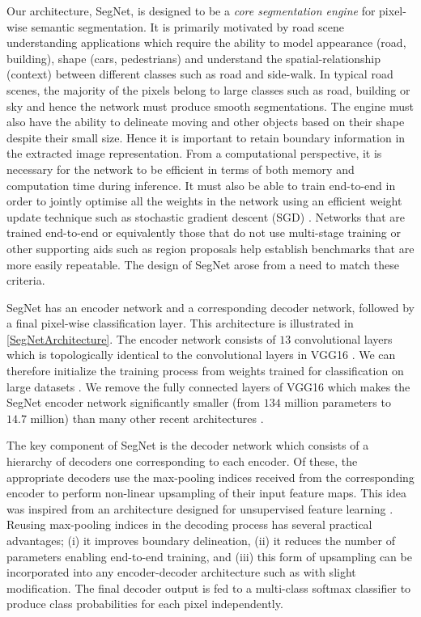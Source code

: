 Our architecture, SegNet, is designed to be a \textit{core segmentation engine} for pixel-wise semantic segmentation. It is primarily motivated by road scene understanding applications which require the ability to model appearance (road, building), shape (cars, pedestrians) and understand the spatial-relationship (context) between different classes such as road and side-walk. In typical road scenes, the majority of the pixels belong to large classes such as road, building or sky and hence the network must produce smooth segmentations. The engine must also have the ability to delineate moving and other objects based on their shape despite their small size. Hence it is important to retain boundary information in the extracted image representation. From a computational perspective, it is necessary for the network to be efficient in terms of both memory and computation time during inference. It must also be able to train end-to-end in order to jointly optimise all the weights in the network using an efficient weight update technique such as stochastic gradient descent (SGD) \citep{Bottou}. Networks that are trained end-to-end or equivalently those that do not use multi-stage training \citep{long2015fully} or other supporting aids such as region proposals \citep{NohDeconvNets} help establish benchmarks that are more easily repeatable. The design of SegNet arose from a need to match these criteria.

SegNet has an encoder network and a corresponding decoder network, followed by a final pixel-wise classification layer. This architecture is illustrated in \cref{SegNetArchitecture}. The encoder network consists of $13$ convolutional layers which is topologically identical to the convolutional layers in VGG16 \citep{simonyan2014very}. We can therefore initialize the training process from weights trained for classification on large datasets \citep{deng2009imagenet}. We remove the fully connected layers of VGG16 which makes the SegNet encoder network significantly smaller (from $134$ million parameters to $14.7$ million) than many other recent architectures \citep{long2015fully,NohDeconvNets,ParseNetRabinovich,DecoupledNet}. 

The key component of SegNet is the decoder network which consists of a hierarchy of decoders one corresponding to each encoder. Of these, the appropriate decoders use the max-pooling indices received from the corresponding encoder to perform non-linear upsampling of their input feature maps. This idea was inspired from an architecture designed for unsupervised feature learning \citep{Ranzato}. Reusing max-pooling indices in the decoding process has several practical advantages; (i) it improves boundary delineation, (ii) it reduces the number of  parameters enabling end-to-end training, and (iii) this form of upsampling can be incorporated into any encoder-decoder architecture such as \citep{long2015fully,CRFRNN} with slight modification. The final decoder output is fed to a multi-class softmax classifier to produce class probabilities for each pixel independently.

